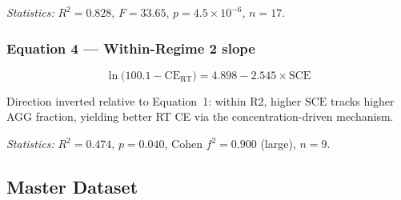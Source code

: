 \documentclass[12pt,letterpaper]{article}
\newcommand{\mSCE}{\mathrm{SCE}}
\newcommand{\mCERT}{\mathrm{CE}_{\mathrm{RT}}}
\begin{document}
\medskip\noindent
\textit{Statistics:} $R^{2} = 0.828$, $F = 33.65$,
$p = 4.5 \times 10^{-6}$, $n = 17$.

\subsubsection*{Equation 4 --- Within-Regime 2 slope}

\begin{equation}
  \ln\!\bigl(100.1 - \mCERT\bigr)
  = 4.898 - 2.545 \times \mSCE
  \label{eq:eq4}
\end{equation}

\noindent Direction inverted relative to Equation~1:
within R2, higher $\mSCE$ tracks higher AGG fraction,
yielding better RT CE via the concentration-driven
mechanism.

\medskip\noindent
\textit{Statistics:} $R^{2} = 0.474$, $p = 0.040$,
Cohen $f^{2} = 0.900$ (large), $n = 9$.

\subsection{Master Dataset}
\label{sec:masterdata}
\end{document}
